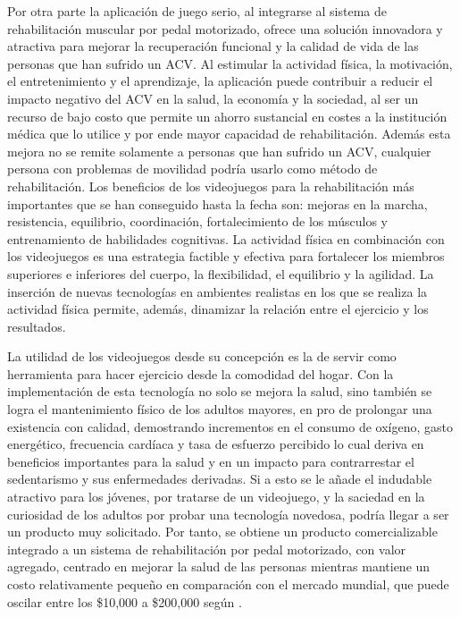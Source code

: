 Por otra parte la aplicación de juego serio, al integrarse al sistema de rehabilitación muscular por pedal motorizado, ofrece una solución innovadora y atractiva para mejorar la recuperación funcional y la calidad de vida de las personas que han sufrido un ACV. Al estimular la actividad física, la motivación, el entretenimiento y el aprendizaje, la aplicación puede contribuir a reducir el impacto negativo del ACV en la salud, la economía y la sociedad, al ser un recurso de bajo costo que permite un ahorro sustancial en costes a la institución médica que lo utilice y por ende mayor capacidad de rehabilitación. Además esta mejora no se remite solamente a personas que han sufrido un ACV, cualquier persona con problemas de movilidad podría usarlo como método de rehabilitación. Los beneficios de los videojuegos para la rehabilitación más importantes que se han conseguido hasta la fecha son: mejoras en la marcha, resistencia, equilibrio, coordinación, fortalecimiento de los músculos y entrenamiento de habilidades cognitivas. La actividad física en combinación con los videojuegos es una estrategia factible y efectiva para fortalecer los miembros superiores e inferiores del cuerpo, la flexibilidad, el equilibrio y la agilidad.  La inserción de nuevas tecnologías en ambientes realistas en los que se realiza la actividad física permite, además, dinamizar la relación entre el ejercicio y los resultados.  

La utilidad de los videojuegos desde su concepción es la de servir como herramienta para hacer ejercicio desde la comodidad del hogar. Con la implementación de esta tecnología no solo se mejora la salud, sino también se logra el mantenimiento físico de los adultos mayores, en pro de prolongar una existencia con calidad, demostrando incrementos en el consumo de oxígeno, gasto energético, frecuencia cardíaca y tasa de esfuerzo percibido lo cual deriva en beneficios importantes para la salud y en un impacto para contrarrestar el sedentarismo y sus enfermedades derivadas. Si a esto se le añade el indudable atractivo para los jóvenes, por tratarse de un videojuego, y la saciedad en la curiosidad de los adultos por probar una tecnología novedosa, podría llegar a ser un producto muy solicitado. Por tanto, se obtiene un producto comercializable integrado a un sistema de rehabilitación por pedal motorizado, con valor agregado, centrado en mejorar la salud de las personas mientras mantiene un costo relativamente pequeño en comparación con el mercado mundial, que puede oscilar entre los \$10,000 a \$200,000 según \cite{Costodeh3}.